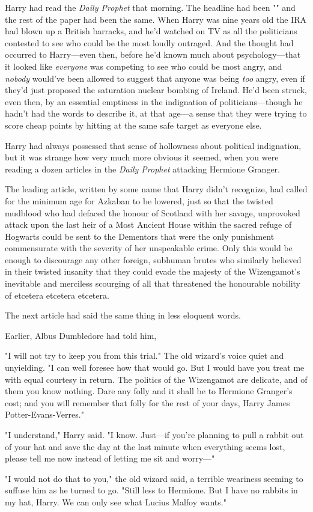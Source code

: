 Harry had read the \emph{Daily Prophet} that morning. The headline had been
"" and the rest of the paper had been
the same. When Harry was nine years old the IRA had blown up a British
barracks, and he'd watched on TV as all the politicians contested to see who
could be the most loudly outraged. And the thought had occurred to Harry---even
then, before he'd known much about psychology---that it looked like
\emph{everyone} was competing to see who could be most angry, and \emph{nobody}
would've been allowed to suggest that anyone was being \emph{too} angry, even
if they'd just proposed the saturation nuclear bombing of Ireland. He'd been
struck, even then, by an essential emptiness in the indignation of
politicians---though he hadn't had the words to describe it, at that age---a
sense that they were trying to score cheap points by hitting at the same safe
target as everyone else.

Harry had always possessed that sense of hollowness about political
indignation, but it was strange how very much more obvious it seemed, when you
were reading a dozen articles in the \emph{Daily Prophet} attacking Hermione
Granger.

The leading article, written by some name that Harry didn't recognize, had
called for the minimum age for Azkaban to be lowered, just so that the twisted
mudblood who had defaced the honour of Scotland with her savage, unprovoked
attack upon the last heir of a Most Ancient House within the sacred refuge of
Hogwarts could be sent to the Dementors that were the only punishment
commensurate with the severity of her unspeakable crime. Only this would be
enough to discourage any other foreign, subhuman brutes who similarly believed
in their twisted insanity that they could evade the majesty of the Wizengamot's
inevitable and merciless scourging of all that threatened the honourable
nobility of etcetera etcetera etcetera.

The next article had said the same thing in less eloquent words.

Earlier, Albus Dumbledore had told him,

\begin{em}
"I will not try to keep you from this trial." The old wizard's voice
quiet and unyielding. "I can well foresee how that would go. But I would have
you treat me with equal courtesy in return. The politics of the Wizengamot are
delicate, and of them you know nothing. Dare any folly and it shall be to
Hermione Granger's cost; and you will remember that folly for the rest of your
days, Harry James Potter-Evans-Verres."

"I understand," Harry said. "I know. Just---if you're planning to pull a
rabbit out of your hat and save the day at the last minute when everything
seems lost, please tell me now instead of letting me sit and worry---"

"I would not do that to you," the old wizard said, a terrible weariness
seeming to suffuse him as he turned to go. "Still less to Hermione. But I have
no rabbits in my hat, Harry. We can only see what Lucius Malfoy wants."
\end{em}

